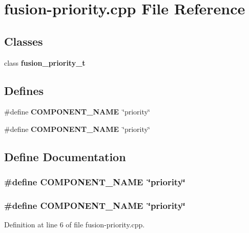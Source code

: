 \section{fusion-priority.cpp File Reference}
\label{fusion-priority_8cpp}
\subsection*{Classes}
\begin{CompactItemize}
\item 
class {\bf fusion\_\-priority\_\-t}
\end{CompactItemize}
\subsection*{Defines}
\begin{CompactItemize}
\item 
\#define {\bf COMPONENT\_\-NAME}~\char`\"{}priority\char`\"{}
\item 
\#define {\bf COMPONENT\_\-NAME}~\char`\"{}priority\char`\"{}
\end{CompactItemize}


\subsection{Define Documentation}
\subsubsection[{COMPONENT\_\-NAME}]{\setlength{\rightskip}{0pt plus 5cm}\#define COMPONENT\_\-NAME~\char`\"{}priority\char`\"{}}\label{zesto-bpred_8cpp_9146ade7ce24e3db226a973a59063892}


\subsubsection[{COMPONENT\_\-NAME}]{\setlength{\rightskip}{0pt plus 5cm}\#define COMPONENT\_\-NAME~\char`\"{}priority\char`\"{}}\label{fusion-priority_8cpp_9146ade7ce24e3db226a973a59063892}




Definition at line 6 of file fusion-priority.cpp.